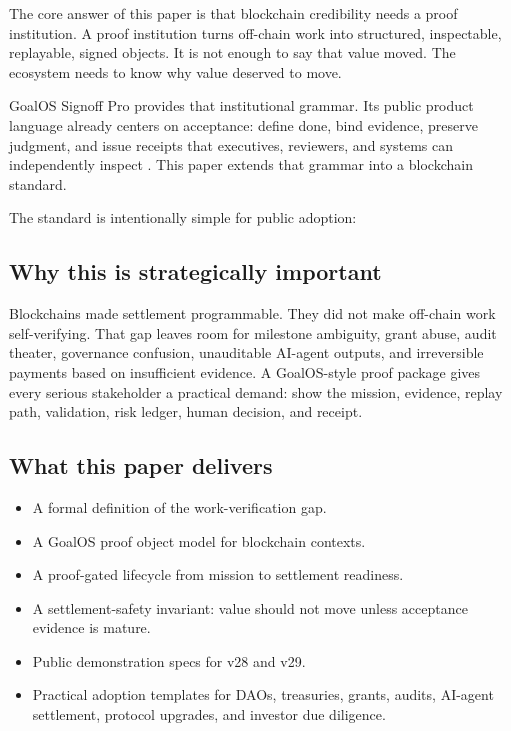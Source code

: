 \documentclass[11pt]{article}
\newcommand{\Signoff}{GoalOS Signoff Pro}
\begin{document}
The core answer of this paper is that blockchain credibility needs a proof institution. A proof institution turns off-chain work into structured, inspectable, replayable, signed objects. It is not enough to say that value moved. The ecosystem needs to know why value deserved to move.

\Signoff{} provides that institutional grammar. Its public product language already centers on acceptance: define done, bind evidence, preserve judgment, and issue receipts that executives, reviewers, and systems can independently inspect \citep{goalosSignoffSite}. This paper extends that grammar into a blockchain standard.

The standard is intentionally simple for public adoption:
\begin{center}
\end{center}

\subsection*{Why this is strategically important}

Blockchains made settlement programmable. They did not make off-chain work self-verifying. That gap leaves room for milestone ambiguity, grant abuse, audit theater, governance confusion, unauditable AI-agent outputs, and irreversible payments based on insufficient evidence. A GoalOS-style proof package gives every serious stakeholder a practical demand: show the mission, evidence, replay path, validation, risk ledger, human decision, and receipt.

\subsection*{What this paper delivers}

\begin{itemize}
  \item A formal definition of the work-verification gap.
  \item A GoalOS proof object model for blockchain contexts.
  \item A proof-gated lifecycle from mission to settlement readiness.
  \item A settlement-safety invariant: value should not move unless acceptance evidence is mature.
  \item Public demonstration specs for v28 and v29.
  \item Practical adoption templates for DAOs, treasuries, grants, audits, AI-agent settlement, protocol upgrades, and investor due diligence.
\end{itemize}
\end{document}
